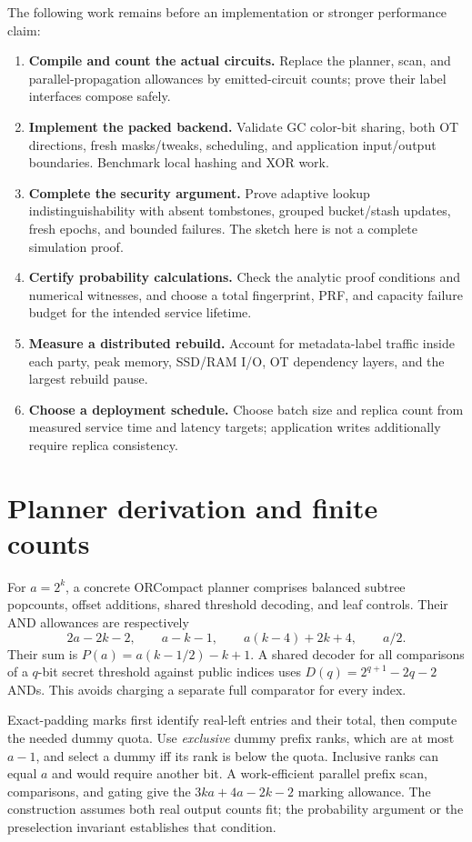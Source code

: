 \documentclass[11pt]{article}
\begin{document}
The following work remains before an implementation or stronger performance
claim:
\begin{enumerate}
\item \textbf{Compile and count the actual circuits.} Replace the planner,
      scan, and parallel-propagation allowances by emitted-circuit counts;
      prove their label interfaces compose safely.
\item \textbf{Implement the packed backend.} Validate GC color-bit sharing,
      both OT directions, fresh masks/tweaks, scheduling, and application
      input/output boundaries. Benchmark local hashing and XOR work.
\item \textbf{Complete the security argument.} Prove adaptive lookup
      indistinguishability with absent tombstones, grouped bucket/stash
      updates, fresh epochs, and bounded failures. The sketch here is not
      a complete simulation proof.
\item \textbf{Certify probability calculations.} Check the analytic proof
      conditions and numerical witnesses, and choose a total fingerprint,
      PRF, and capacity failure budget for the intended service lifetime.
\item \textbf{Measure a distributed rebuild.} Account for metadata-label
      traffic inside each party, peak memory, SSD/RAM I/O, OT dependency
      layers, and the largest rebuild pause.
\item \textbf{Choose a deployment schedule.} Choose batch size and replica
      count from measured service time and latency targets; application
      writes additionally require replica consistency.
\end{enumerate}

\appendix
\section{Planner derivation and finite counts}\label{app:planner}
For $a=2^k$, a concrete ORCompact planner comprises balanced subtree
popcounts, offset additions, shared threshold decoding, and leaf controls.
Their AND allowances are respectively
\[
 2a-2k-2,\qquad a-k-1,\qquad a(k-4)+2k+4,\qquad a/2.
\]
Their sum is $P(a)=a(k-1/2)-k+1$. A shared decoder for all comparisons
of a $q$-bit secret threshold against public indices uses
$D(q)=2^{q+1}-2q-2$ ANDs. This avoids charging a separate full comparator
for every index.

Exact-padding marks first identify real-left entries and their total,
then compute the needed dummy quota. Use \emph{exclusive} dummy prefix
ranks, which are at most $a-1$, and select a dummy iff its rank is below
the quota. Inclusive ranks can equal $a$ and would require another bit.
A work-efficient parallel prefix scan, comparisons, and gating give the
$3ka+4a-2k-2$ marking allowance. The construction assumes both real
output counts fit; the probability argument or the preselection invariant
establishes that condition.
\end{document}
